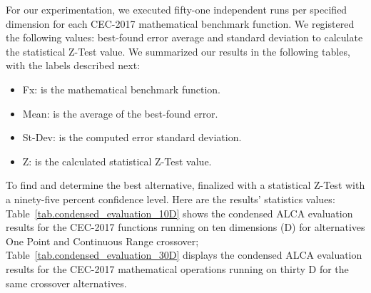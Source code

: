 \documentclass[graybox]{svmult}
\begin{document}
    For our experimentation, we executed fifty-one independent runs per specified dimension for each CEC-2017 mathematical benchmark function. We registered the following values: best-found error average and standard deviation to calculate the statistical Z-Test value. We summarized our results in the following tables, with the labels described next:

    \begin{itemize}
        \item   Fx:          is the mathematical benchmark function.
        \item   Mean:        is the average of the best-found error.
        \item   St-Dev:      is the computed error standard deviation. 
        \item   Z:           is the calculated statistical Z-Test value.
    \end{itemize}

    To find and determine the best alternative, finalized with a statistical Z-Test with a ninety-five percent confidence level. Here are the results' statistics values: Table~\ref{tab.condensed_evaluation_10D} shows the condensed ALCA evaluation results for the CEC-2017 functions running on ten dimensions (D) for alternatives One Point and Continuous Range crossover; Table~\ref{tab.condensed_evaluation_30D} displays the condensed ALCA evaluation results for the CEC-2017 mathematical operations running on thirty D for the same crossover alternatives.
\end{document}
